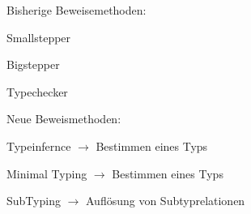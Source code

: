 {
    \begin{itemgroup}{Bisherige Beweisemethoden:}
	\item Smallstepper
	\item Bigstepper
	\item Typechecker
	\end{itemgroup}
    
	\begin{itemgroup}{Neue Beweismethoden:}
	\item Typeinfernce $\to$ Bestimmen eines Typs
	\item Minimal Typing $\to$ Bestimmen eines Typs
	\item SubTyping $\to$ Auflösung von Subtyprelationen
	\end{itemgroup}
  
}